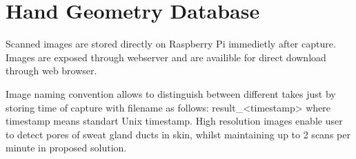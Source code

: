 \section{Hand Geometry Database}
\label{sec:db}
Scanned images are stored directly on Raspberry Pi immedietly after capture. Images are exposed
through webserver and are availible for direct download through web browser.

Image naming convention allows to distinguish between different takes just by storing time of
capture with filename as follows: result\_<timestamp> where timestamp means standart Unix timestamp.
High resolution images enable user to detect pores of sweat gland ducts in skin, whilst maintaining
up to 2 scans per minute in proposed solution.